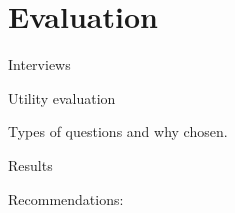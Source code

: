\section{Evaluation}

Interviews

Utility evaluation

Types of questions and why chosen. \cite{Walker2013Qualitative}

Results


Recommendations:
\cite{Carver2001_PPGIS_Cyberdemocracy} 